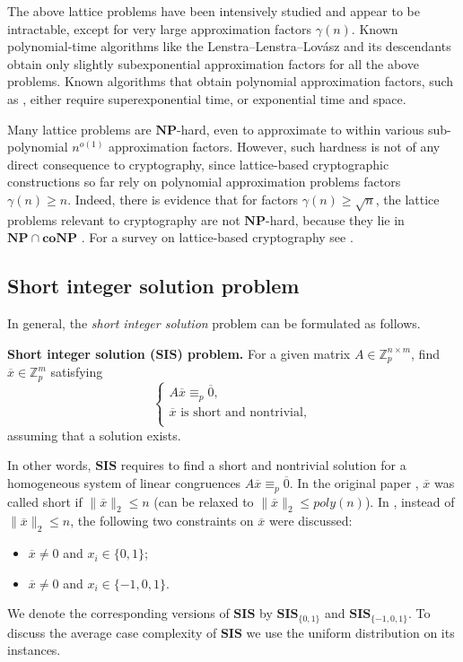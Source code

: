 \documentclass{jgcc}
\def\ovo{{\overline{0}}}
\def\ovx{{\overline{x}}}
\def\NP{{\mathbf{NP}}}
\def\coNP{{\mathbf{coNP}}}
\def\SIS{{\mathbf{SIS}}}
\def\MZ{{\mathbb{Z}}}
\begin{document}
The above lattice problems have been intensively studied and appear to be
intractable, except for very large approximation factors $\gamma(n)$.
Known polynomial-time algorithms like the
Lenstra--Lenstra--Lov\'asz \cite{Lenstra-Lenstra-Lovasz:1982}
and its descendants obtain only slightly subexponential approximation factors 
for all the above problems.
Known algorithms that obtain polynomial
approximation factors, such as \cite{Kannan:1983, Ajtai-Kumar-Sivakumar:2001, Micciancio-Voulgaris:2010, Aggarwal-Dadush-Regev-Stephens-Davidowitz:2015},
either require superexponential time, or exponential time and space.

Many lattice problems are $\NP$-hard, even to approximate to within various sub-polynomial $n^{o(1)}$ approximation factors.
However, such hardness is not of any direct consequence to cryptography, 
since lattice-based cryptographic constructions so far rely on polynomial
approximation problems factors $\gamma(n)\ge n$.
Indeed, there is evidence that for factors 
$\gamma(n) \ge \sqrt{n}$, the lattice
problems relevant to cryptography are not $\NP$-hard, because they lie in 
$\NP \cap \coNP$ \cite{Goldreich-Goldwasser:2000, Aharonov-Regev:2005}.
For a survey on lattice-based cryptography see \cite{Peikert:2016}.


\subsection{Short integer solution problem}


In general, the \emph{short integer solution} problem
can be formulated as follows.

\medskip\noindent
\textbf{Short integer solution ($\SIS$) problem.}
For a given matrix $A\in\MZ_p^{n\times m}$,
find $\ovx\in\MZ_p^m$ satisfying
\begin{equation}\label{eq:SIS}
\left\{
\begin{array}{l}
A\ovx\equiv_p \ovo,\\
\ovx \mbox{ is short and nontrivial},\\
\end{array}
\right.
\end{equation}
assuming that a solution exists.

\medskip
In other words, $\SIS$ requires to find 
a short and nontrivial solution for a homogeneous system of 
linear congruences $A\ovx\equiv_p \ovo$. 
In the original paper \cite{Ajtai-1996}, 
$\ovx$ was called short if $\|\ovx\|_2\le n$
(can be relaxed to $\|\ovx\|_2\le poly(n)$).
In \cite{Goldreich-Goldwasser-Halevi:1997}, 
instead of $\|\ovx\|_2\le n$, 
the following two constraints on $\ovx$ were discussed:
\begin{itemize}
\item 
$\ovx\ne 0$ and $x_i\in \{0,1\}$;
\item 
$\ovx\ne 0$ and $x_i\in \{-1,0,1\}$.
\end{itemize}
We denote the corresponding versions of $\SIS$ by
$\SIS_{\{0,1\}}$ and $\SIS_{\{-1,0,1\}}$.
To discuss the average case complexity of $\SIS$ we use 
the uniform distribution on its instances.
\end{document}
